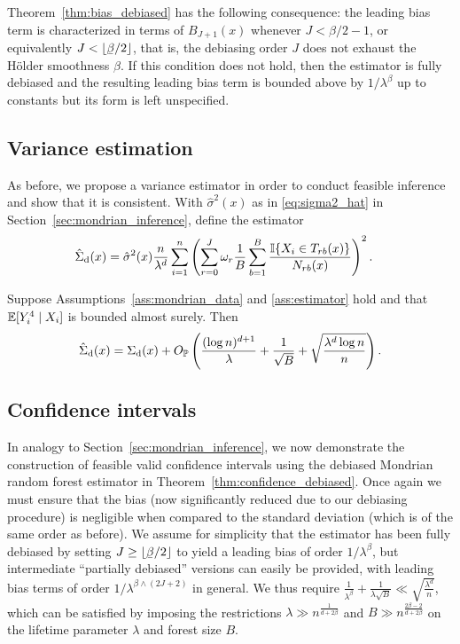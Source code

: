 Theorem~\ref{thm:bias_debiased} has the following consequence:
the leading bias term is characterized in terms of
$B_{J+1}(x)$ whenever $J < \beta/2 - 1$,
or equivalently $J < \lfloor \flbeta/2 \rfloor$,
that is, the debiasing order
$J$ does not exhaust the H{\"o}lder smoothness $\beta$.
If this condition does not hold, then the estimator is
fully debiased and the resulting leading bias
term is bounded above by $1/\lambda^\beta$ up to constants
but its form is left unspecified.

\subsection*{Variance estimation}

As before, we propose a variance estimator
in order to conduct feasible inference and show that
it is consistent.
With $\hat\sigma^2(x)$ as in \eqref{eq:sigma2_hat}
in Section~\ref{sec:mondrian_inference}, define the estimator
%
\begin{align*}
  \hat\Sigma_{\mathrm{d}}(x)
  &=
  \hat\sigma^2(x)
  \frac{n}{\lambda^d}
  \sum_{i=1}^n
  \left(
    \sum_{r=0}^J
    \omega_r
    \frac{1}{B}
    \sum_{b=1}^B
    \frac{\mathbb{I}\{X_i \in T_{r b}(x)\}}
    {N_{r b}(x)}
  \right)^2.
\end{align*}
%
\begin{theorem}%
  \label{thm:variance_estimation_debiased}
  Suppose Assumptions~\ref{ass:mondrian_data}
  and \ref{ass:estimator} hold and that
  $\mathbb{E}[Y_i^4 \mid X_i ]$ is bounded almost surely.
  Then
  \begin{align*}
    \hat\Sigma_{\mathrm{d}}(x)
    = \Sigma_{\mathrm{d}}(x)
    + O_{\mathbb{P}} \left(
      \frac{(\log n)^{d+1}}{\lambda}
      + \frac{1}{\sqrt B}
      + \sqrt{\frac{\lambda^d \log n}{n}}
    \right).
  \end{align*}
\end{theorem}

\subsection{Confidence intervals}

In analogy to Section~\ref{sec:mondrian_inference},
we now demonstrate the construction of feasible valid confidence
intervals using the debiased Mondrian random forest estimator
in Theorem~\ref{thm:confidence_debiased}.
Once again we must ensure that the bias
(now significantly reduced due to our debiasing procedure)
is negligible when compared to the standard deviation
(which is of the same order as before).
We assume for simplicity that the estimator has been fully
debiased by setting $J \geq \lfloor \flbeta / 2\rfloor$
to yield a leading bias of order $1/\lambda^\beta$,
but intermediate ``partially debiased'' versions can easily
be provided, with leading bias terms of order
$1/\lambda^{\beta \wedge (2J+2)}$ in general.
We thus require
$\frac{1}{\lambda^\beta} + \frac{1}{\lambda \sqrt B}
\ll \sqrt{\frac{\lambda^d}{n}}$,
which can be satisfied by imposing the restrictions
$\lambda \gg n^{\frac{1}{d + 2 \beta}}$
and $B \gg n^{\frac{2\beta - 2}{d + 2\beta}}$
on the lifetime parameter $\lambda$
and forest size $B$.

